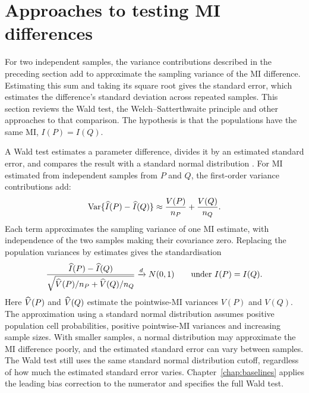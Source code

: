 \section{Approaches to testing MI differences}
\allowdisplaybreaks
\label{sec:welch-background}

For two independent samples, the variance contributions described in the
preceding section add to approximate the sampling variance of the MI
difference. Estimating this sum and taking its square root gives the
standard error, which estimates the difference's standard deviation across
repeated samples. This section
reviews the Wald test, the Welch--Satterthwaite principle and other
approaches to that comparison. The hypothesis is that the populations
have the same MI, \(I(P)=I(Q)\).


A Wald test estimates a parameter difference, divides it by an estimated
standard error, and compares the result with a standard normal distribution
\citep{wald1943,vanderVaart1998}.
For MI estimated from independent samples from \(P\) and \(Q\), the
first-order variance contributions add:
\begin{equation}
  \operatorname{Var}\{\widehat I(P)-\widehat I(Q)\}
  \approx \frac{V(P)}{n_P}+\frac{V(Q)}{n_Q}.
  \label{eq:background-two-sample-variance}
\end{equation}
Each term approximates the sampling variance of one MI estimate, with
independence of the two samples making their covariance zero. Replacing
the population variances by estimates gives the standardisation
\begin{equation}
  \frac{\widehat I(P)-\widehat I(Q)}
       {\sqrt{\widehat V(P)/n_P+\widehat V(Q)/n_Q}}
  \xrightarrow{d}N(0,1)
  \qquad\text{under }I(P)=I(Q).
  \label{eq:background-wald-standardisation}
\end{equation}
Here \(\widehat V(P)\) and \(\widehat V(Q)\) estimate the pointwise-MI variances
\(V(P)\) and \(V(Q)\). The approximation using a standard normal distribution
assumes positive population cell probabilities, positive pointwise-MI
variances and increasing sample sizes. With smaller samples, a normal
distribution may approximate the MI difference poorly, and the estimated
standard error can vary between samples. The Wald test still uses the same standard normal distribution
cutoff, regardless of how much the estimated standard error varies.
Chapter~\ref{chap:baselines} applies the leading bias correction to the
numerator and specifies the full Wald test.


